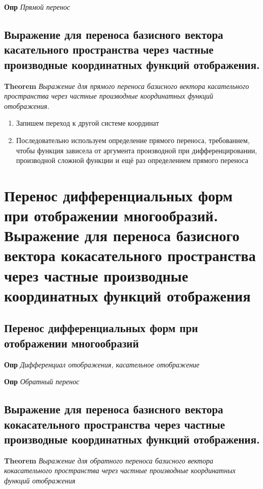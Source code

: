 \documentclass[a4paper, 14pt]{article}
\begin{document}
    \textbf{Опр} \textit{Прямой перенос}
    
    \subsection{Выражение для переноса базисного вектора касательного пространства через частные производные
    координатных функций отображения.}
    
    \textbf{Theorem} \textit{Выражение для прямого переноса базисного вектора касательного пространства через частные
    производные координатных функций отображения.}
    
    \begin{enumerate}
        \item Запишем переход к другой системе координат
        \item Последовательно используем определение прямого переноса, требованием, чтобы функция зависела от
        аргумента производной при дифференцировании, производной сложной функции и ещё раз определением прямого переноса
    \end{enumerate}
    
    \section{Перенос дифференциальных форм при отображении многообразий.
    Выражение для переноса базисного вектора кокасательного пространства через частные производные координатных
    функций отображения}
    
    \subsection{Перенос дифференциальных форм при отображении многообразий}
    
    \textbf{Опр} \textit{Дифференциал отображения, касательное отображение}
    
    \textbf{Опр} \textit{Обратный перенос}
    
    \subsection{Выражение для переноса базисного вектора кокасательного пространства через частные производные
    координатных функций отображения.}
    
    \textbf{Theorem} \textit{Выражение для обратного переноса базисного вектора кокасательного пространства через частные
    производные координатных функций отображения}
    
\end{document}
